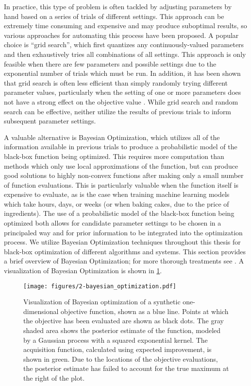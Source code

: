 In practice, this type of problem is often tackled by adjusting parameters by hand based on a series of trials of different settings.
This approach can be extremely time consuming and expensive and may produce suboptimal results, so various approaches for automating this process have been proposed.
A popular choice is ``grid search'', which first quantizes any continuously-valued parameters and then exhaustively tries all combinations of all settings.
This approach is only feasible when there are few parameters and possible settings due to the exponential number of trials which must be run.
In addition, it has been shown that grid search is often less efficient than simply randomly trying different parameter values, particularly when the setting of one or more parameters does not have a strong effect on the objective value \cite{}.
While grid search and random search can be effective, neither utilize the results of previous trials to inform subsequent parameter settings.

A valuable alternative is Bayesian Optimization, which utilizes all of the information available in previous trials to produce a probabilistic model of the black-box function being optimized.
This requires more computation than methods which only use local approximations of the function, but can produce good solutions to highly non-convex functions after making only a small number of function evaluations.
This is particularly valuable when the function itself is expensive to evaluate, as is the case when training machine learning models which take hours, days, or weeks (or when baking cakes, due to the price of ingredients).
The use of a probabilistic model of the black-box function being optimized both allows for candidate parameter settings to be chosen in a principaled way and for prior information to be integrated into the optimization process.
We utilize Bayesian Optimization techniques throughout this thesis for black-box optimization of different algorithms and systems.
This section provides a brief overview of Bayesian Optimization; for more thorough treatments see \cite{}.
A visualization of Bayesian Optimization is shown in \cref{fig:bayesian_optimization}.

\begin{figure}
  \centering
  \texttt{[image: figures/2-bayesian\_optimization.pdf]}
  \caption[Bayesian optimization of a synthetic function]{Visualization of Bayesian optimization of a synthetic one-dimensional objective function, shown as a blue line.
  Points at which the objective has been evaluated are shown as black dots.
  The gray shaded area shows the posterior estimate of the function, modeled by a Gaussian process with a squared exponential kernel.
  The acquisition function, calculated using expected improvement, is shown in green.
  Due to the locations of the objective evaluations, the posterior estimate has failed to account for the true maximum at the right of the plot.}
  \label{fig:bayesian_optimization}
\end{figure}


